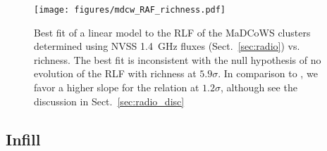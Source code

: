 \documentclass[longauth]{aa} %
\newcommand{\madcows}{MaDCoWS\xspace}
\begin{document}
\begin{figure}
    \centering
    \texttt{[image: figures/mdcw\_RAF\_richness.pdf]}
    \caption{Best fit of a linear model to the RLF of the \madcows clusters determined using NVSS 1.4~GHz fluxes (Sect.~\ref{sec:radio}) vs. richness. The best fit is inconsistent with the null hypothesis of no evolution of the RLF with richness at $5.9\sigma$. In comparison to \citet{Mo2020}, we favor a  higher slope for the relation at $1.2\sigma$, although see the discussion in Sect.~\ref{sec:radio_disc}}
    \label{fig:RLF}
\end{figure}



\subsection{Infill}
\end{document}
